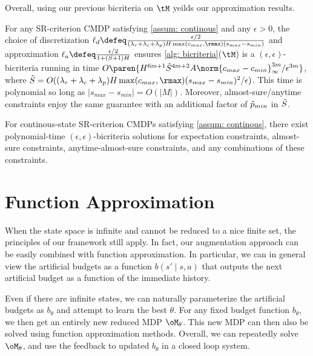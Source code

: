 \documentclass[pdftex, a4paper, 12pt]{article}
\newcommand{\cmin}{c_{min}}
\newcommand{\cmax}{c_{max}}
\newcommand{\smax}{s_{max}}
\newcommand{\smin}{s_{min}}
\begin{document}
Overall, using our previous bicriteria on $\tM$ yeilds our approximation results.

\begin{theorem}\label{thm: discretized}
    For any SR-criterion CMDP satisfying \cref{assum: continous} and any $\epsilon > 0$, the choice of discretization $\ell_d \defeq \frac{\epsilon/2}{(\lambda_r + \lambda_c + \lambda_p)H\max(\cmax, \rmax)(\smax - \smin)}$ and approximation $\ell_a \defeq \frac{\epsilon/2}{1 + (S+1)H}$ ensures \cref{alg: bicriteria}($\tM$) is a $(\epsilon, \epsilon)$-bicriteria running in time $O\paren{H^{6m+1}\Tilde{S}^{4m+2}A\norm{\cmax - \cmin}_{\infty}^{3m}/\epsilon^{3m}}$, where $\Tilde{S} = O((\lambda_r + \lambda_c + \lambda_p)H\max(\cmax, \rmax)\allowdisplaybreaks(\smax - \smin)^2/\epsilon)$. This time is polynomial so long as $|\smax - \smin| = O(|M|)$. Moreover, almost-sure/anytime constraints enjoy the same guarantee with an additional factor of $\Tilde{p}_{min}$ in $\Tilde{S}$.
\end{theorem}

\begin{corollary}[Simplified]\label{cor: discretized}
    For continous-state SR-criterion CMDPs satisfying \cref{assum: continous}, there exist polynomial-time $(\epsilon,\epsilon)$-bicriteria solutions for expectation constraints, almost-sure constraints, anytime-almost-sure constraints, and any combinations of these constraints.
\end{corollary}


\section{Function Approximation}\label{sec: function}

When the state space is infinite and cannot be reduced to a nice finite set, the principles of our framework still apply. In fact, our augmentation approach can be easily combined with function approximation. In particular, we can in general view the artificial budgets as a function $b(s' \mid s,a)$ that outputs the next artificial budget as a function of the immediate history. 

Even if there are infinite states, we can naturally parameterize the artificial budgets as $b_{\theta}$ and attempt to learn the best $\theta$. For any fixed budget function $b_{\theta}$, we then get an entirely new reduced MDP $\oM_{\theta}$. This new MDP can then also be solved using function approximation methods. Overall, we can repeatedly solve $\oM_{\theta}$, and use the feedback to updated $b_{\theta}$ in a closed loop system.
\end{document}
